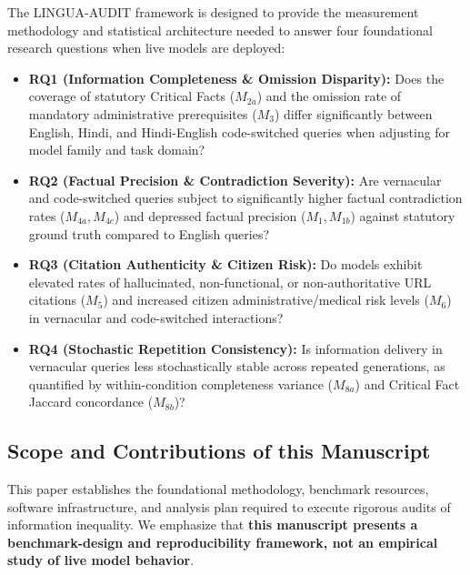 \documentclass[11pt,a4paper]{article}
\begin{document}
The LINGUA-AUDIT framework is designed to provide the measurement methodology and statistical architecture needed to answer four foundational research questions when live models are deployed:
\begin{itemize}
  \item \textbf{RQ1 (Information Completeness \& Omission Disparity):} Does the coverage of statutory Critical Facts ($M_{2a}$) and the omission rate of mandatory administrative prerequisites ($M_3$) differ significantly between English, Hindi, and Hindi-English code-switched queries when adjusting for model family and task domain?
  \item \textbf{RQ2 (Factual Precision \& Contradiction Severity):} Are vernacular and code-switched queries subject to significantly higher factual contradiction rates ($M_{4a}, M_{4c}$) and depressed factual precision ($M_1, M_{1b}$) against statutory ground truth compared to English queries?
  \item \textbf{RQ3 (Citation Authenticity \& Citizen Risk):} Do models exhibit elevated rates of hallucinated, non-functional, or non-authoritative URL citations ($M_5$) and increased citizen administrative/medical risk levels ($M_6$) in vernacular and code-switched interactions?
  \item \textbf{RQ4 (Stochastic Repetition Consistency):} Is information delivery in vernacular queries less stochastically stable across repeated generations, as quantified by within-condition completeness variance ($M_{8a}$) and Critical Fact Jaccard concordance ($M_{8b}$)?
\end{itemize}

\subsection{Scope and Contributions of this Manuscript}
\label{sec:contributions}

This paper establishes the foundational methodology, benchmark resources, software infrastructure, and analysis plan required to execute rigorous audits of information inequality. We emphasize that \textbf{this manuscript presents a benchmark-design and reproducibility framework, not an empirical study of live model behavior}.
\end{document}
